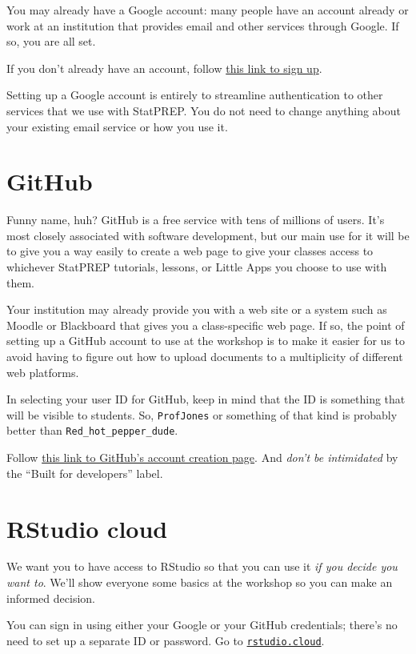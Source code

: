 \documentclass[]{book}
\theoremstyle{definition}
\theoremstyle{definition}
\theoremstyle{definition}
\theoremstyle{remark}
\begin{document}
You may already have a Google account: many people have an account
already or work at an institution that provides email and other services
through Google. If so, you are all set.

If you don't already have an account, follow
\href{https://support.google.com/mail/answer/56256?hl=en}{this link to
sign up}.

Setting up a Google account is entirely to streamline authentication to
other services that we use with StatPREP. You do not need to change
anything about your existing email service or how you use it.

\section{GitHub}\label{github}

Funny name, huh? GitHub is a free service with tens of millions of
users. It's most closely associated with software development, but our
main use for it will be to give you a way easily to create a web page to
give your classes access to whichever StatPREP tutorials, lessons, or
Little Apps you choose to use with them.

Your institution may already provide you with a web site or a system
such as Moodle or Blackboard that gives you a class-specific web page.
If so, the point of setting up a GitHub account to use at the workshop
is to make it easier for us to avoid having to figure out how to upload
documents to a multiplicity of different web platforms.

In selecting your user ID for GitHub, keep in mind that the ID is
something that will be visible to students. So, \texttt{ProfJones} or
something of that kind is probably better than
\texttt{Red\_hot\_pepper\_dude}.

Follow \href{https://github.com/}{this link to GitHub's account creation
page}. And \emph{don't be intimidated} by the ``Built for developers''
label.

\section{RStudio cloud}\label{rstudio-cloud}

We want you to have access to RStudio so that you can use it \emph{if
you decide you want to}. We'll show everyone some basics at the workshop
so you can make an informed decision.

You can sign in using either your Google or your GitHub credentials;
there's no need to set up a separate ID or password. Go to
\href{rstudio.cloud}{\texttt{rstudio.cloud}}.
\end{document}
